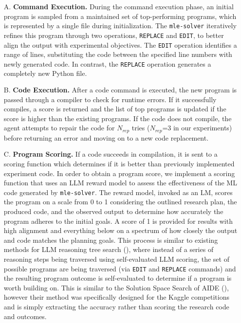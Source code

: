 \documentclass[11pt, a4paper]{gdm_format}
\begin{document}
\begin{enumerate}
    \item [A.] \textbf{Command Execution.} During the command execution phase, an initial program is sampled from a maintained set of top-performing programs, which is represented by a single file during initialization. The \texttt{mle-solver} iteratively refines this program through two operations, \texttt{REPLACE} and \texttt{EDIT}, to better align the output with experimental objectives. The \texttt{EDIT} operation identifies a range of lines, substituting the code between the specified line numbers with newly generated code. In contrast, the \texttt{REPLACE} operation generates a completely new Python file.
    \item [B.] \textbf{Code Execution.} After a code command is executed, the new program is passed through a compiler to check for runtime errors. If it successfully compiles, a score is returned and the list of top programs is updated if the score is higher than the existing programs. If the code does not compile, the agent attempts to repair the code for $N_{rep}$ tries ($N_{rep}$=3 in our experiments) before returning an error and moving on to a new code replacement.
    \item [C.] \textbf{Program Scoring.} If a code succeeds in compilation, it is sent to a scoring function which determines if it is better than previously implemented experiment code. In order to obtain a program score, we implement a scoring function that uses an LLM reward model to assess the effectiveness of the ML code generated by \texttt{mle-solver}. The reward model, invoked as an LM, scores the program on a scale from 0 to 1 considering the outlined research plan, the produced code, and the observed output to determine how accurately the program adheres to the initial goals. A score of 1 is provided for results with high alignment and everything below on a spectrum of how closely the output and code matches the planning goals. This process is similar to existing methods for LLM reasoning tree search (\cite{yao2024tree}), where instead of a series of reasoning steps being traversed using self-evaluated LLM scoring, the set of possible programs are being traversed (via \texttt{EDIT} and \texttt{REPLACE} commands) and the resulting program outcome is self-evaluated to determine if a program is worth building on. This is similar to the Solution Space Search of AIDE (\cite{AIDE}), however their method was specifically designed for the Kaggle competitions and is simply  extracting the accuracy rather than scoring the research code and outcomes.

\end{enumerate}
\end{document}
